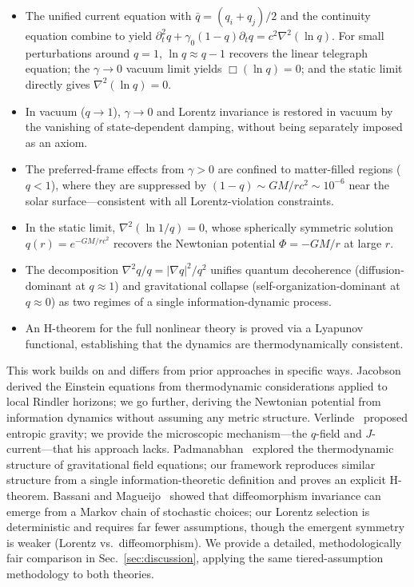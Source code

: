 \documentclass[aps,prd,twocolumn,showpacs,superscriptaddress,preprintnumbers]{revtex4-2}
\begin{document}
\begin{itemize}
    \item The unified current equation with $\bar{q}=(q_i+q_j)/2$ and the continuity equation combine to yield $\partial_t^2 q + \gamma_0(1-q)\partial_t q = c^2\nabla^2(\ln q)$. For small perturbations around $q=1$, $\ln q\approx q-1$ recovers the linear telegraph equation; the $\gamma\to0$ vacuum limit yields $\Box(\ln q)=0$; and the static limit directly gives $\nabla^2(\ln q)=0$.
    \item In vacuum ($q\to1$), $\gamma\to0$ and Lorentz invariance is restored in vacuum by the vanishing of state-dependent damping, without being separately imposed as an axiom.
    \item The preferred-frame effects from $\gamma>0$ are confined to matter-filled regions ($q<1$), where they are suppressed by $(1-q)\sim GM/rc^2\sim10^{-6}$ near the solar surface---consistent with all Lorentz-violation constraints.
    \item In the static limit, $\nabla^2(\ln 1/q)=0$, whose spherically symmetric solution $q(r)=e^{-GM/rc^2}$ recovers the Newtonian potential $\Phi=-GM/r$ at large $r$.
    \item The decomposition $\nabla^2 q/q = |\nabla q|^2/q^2$ unifies quantum decoherence (diffusion-dominant at $q\approx1$) and gravitational collapse (self-organization-dominant at $q\approx0$) as two regimes of a single information-dynamic process.
    \item An H-theorem for the full nonlinear theory is proved via a Lyapunov functional, establishing that the dynamics are thermodynamically consistent.
\end{itemize}

This work builds on and differs from prior approaches in specific ways.
Jacobson~\cite{Jacobson:1995ab} derived the Einstein equations from thermodynamic considerations applied to local Rindler horizons; we go further, deriving the Newtonian potential from information dynamics without assuming any metric structure.
Verlinde~\cite{Verlinde:2010hp} proposed entropic gravity; we provide the microscopic mechanism---the $q$-field and $J$-current---that his approach lacks.
Padmanabhan~\cite{Padmanabhan:2010} explored the thermodynamic structure of gravitational field equations; our framework reproduces similar structure from a single information-theoretic definition and proves an explicit H-theorem.
Bassani and Magueijo~\cite{Bassani:2025htma} showed that diffeomorphism invariance can emerge from a Markov chain of stochastic choices; our Lorentz selection is deterministic and requires far fewer assumptions, though the emergent symmetry is weaker (Lorentz vs.\ diffeomorphism).
We provide a detailed, methodologically fair comparison in Sec.~\ref{sec:discussion}, applying the same tiered-assumption methodology to both theories.
\end{document}
